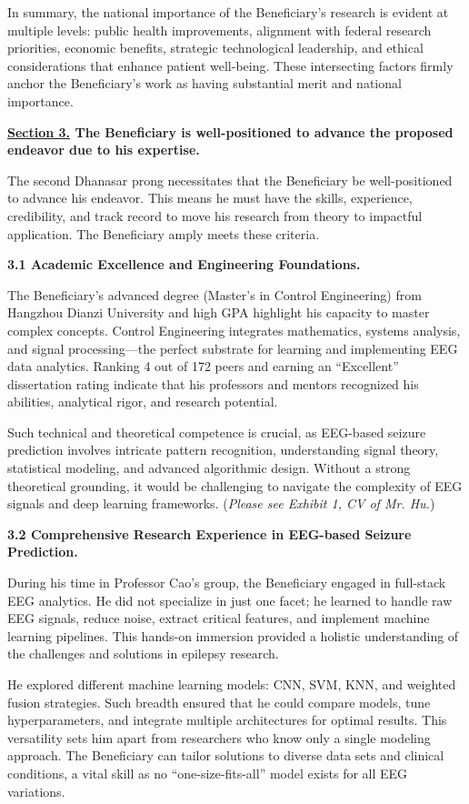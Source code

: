 \documentclass{article}
\begin{document}
In summary, the national importance of the Beneficiary’s research is evident at multiple levels: public health improvements, alignment with federal research priorities, economic benefits, strategic technological leadership, and ethical considerations that enhance patient well-being. These intersecting factors firmly anchor the Beneficiary’s work as having substantial merit and national importance.


\clearpage

{\bf \underline{Section 3.} The Beneficiary is well-positioned to advance the proposed endeavor due to his expertise. }

The second Dhanasar prong necessitates that the Beneficiary be well-positioned to advance his endeavor. This means he must have the skills, experience, credibility, and track record to move his research from theory to impactful application. The Beneficiary amply meets these criteria.


{\bf 3.1 Academic Excellence and Engineering Foundations.}

The Beneficiary’s advanced degree (Master’s in Control Engineering) from Hangzhou Dianzi University and high GPA highlight his capacity to master complex concepts. Control Engineering integrates mathematics, systems analysis, and signal processing—the perfect substrate for learning and implementing EEG data analytics. Ranking 4 out of 172 peers and earning an “Excellent” dissertation rating indicate that his professors and mentors recognized his abilities, analytical rigor, and research potential.

Such technical and theoretical competence is crucial, as EEG-based seizure prediction involves intricate pattern recognition, understanding signal theory, statistical modeling, and advanced algorithmic design. Without a strong theoretical grounding, it would be challenging to navigate the complexity of EEG signals and deep learning frameworks. ({\it Please see Exhibit 1, CV of Mr. Hu.}) 

{\bf 3.2 Comprehensive Research Experience in EEG-based Seizure Prediction.}

During his time in Professor Cao’s group, the Beneficiary engaged in full-stack EEG analytics. He did not specialize in just one facet; he learned to handle raw EEG signals, reduce noise, extract critical features, and implement machine learning pipelines. This hands-on immersion provided a holistic understanding of the challenges and solutions in epilepsy research.

He explored different machine learning models: CNN, SVM, KNN, and weighted fusion strategies. Such breadth ensured that he could compare models, tune hyperparameters, and integrate multiple architectures for optimal results. This versatility sets him apart from researchers who know only a single modeling approach. The Beneficiary can tailor solutions to diverse data sets and clinical conditions, a vital skill as no “one-size-fits-all” model exists for all EEG variations.
\end{document}

